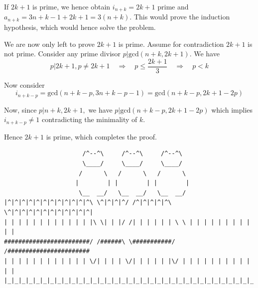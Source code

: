 \documentclass[a4paper, 12pt]{article}
\begin{document}
\begin{enumerate}
    If $2k+1$ is prime, we hence obtain $i_{n+k}=2k+1$ prime and $a_{n+k}=3n+k-1+2k+1=3(n+k)$. This would prove the induction hypothesis, which would hence solve the problem.
    
    We are now only left to prove $2k+1$ is prime. Assume for contradiction $2k+1$ is not prime. Consider any prime divisor $p|\textrm{gcd}(n+k, 2k+1)$. We have
     $$ p|2k+1, p\neq 2k+1 \quad \Longrightarrow \quad p \leq \frac{2k+1}{3} \quad \Longrightarrow \quad p<k $$
     
     Now consider
     $$ i_{n+k-p}=\textrm{gcd}(n+k-p, 3n+k-p-1)=\textrm{gcd}(n+k-p, 2k+1-2p) $$
     
     Now, since $p|n+k, 2k+1,$ we have $p|\textrm{gcd}(n+k-p, 2k+1-2p)$ which implies $ i_{n+k-p} \neq 1$ contradicting the minimality of $k$.
     
     Hence $2k+1$ is prime, which completes the proof.
    
    
\end{enumerate}

\vspace{3cm}
\centering
\begin{BVerbatim}
                      /^--^\     /^--^\     /^--^\
                      \____/     \____/     \____/
                     /      \   /      \   /      \
                    |        | |        | |        |
                     \__  __/   \__  __/   \__  __/
|^|^|^|^|^|^|^|^|^|^|^|^\ \^|^|^|^/ /^|^|^|^|^\ \^|^|^|^|^|^|^|^|^|^|^|^|
| | | | | | | | | | | | |\ \| | |/ /| | | | | | \ \ | | | | | | | | | | |
########################/ /######\ \###########/ /#######################
| | | | | | | | | | | | \/| | | | \/| | | | | |\/ | | | | | | | | | | | |
|_|_|_|_|_|_|_|_|_|_|_|_|_|_|_|_|_|_|_|_|_|_|_|_|_|_|_|_|_|_|_|_|_|_|_|_|
\end{BVerbatim}
\end{document}
